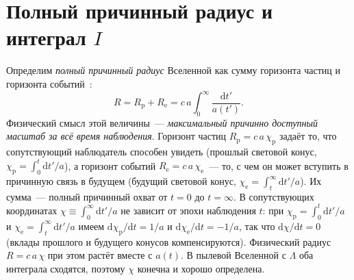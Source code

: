 \documentclass[12pt,a4paper]{article}
\begin{document}
\section{Полный причинный радиус и интеграл \texorpdfstring{$I$}{I}}

Определим \emph{полный причинный радиус} Вселенной как сумму горизонта частиц и горизонта событий~\cite{Davis2004}:
\begin{equation}
R = R_{\mathrm{p}} + R_{\mathrm{e}} = c\,a\int_0^{\infty}\frac{\mathrm{d}t'}{a(t')}.
\end{equation}
Физический смысл этой величины~--- \emph{максимальный причинно доступный масштаб за всё время наблюдения}. Горизонт частиц $R_{\mathrm{p}}=c\,a\,\chi_{\mathrm{p}}$ задаёт то, что сопутствующий наблюдатель способен увидеть (прошлый световой конус, $\chi_{\mathrm{p}}=\int_0^{t}\mathrm{d}t'/a$), а горизонт событий $R_{\mathrm{e}}=c\,a\,\chi_{\mathrm{e}}$~--- то, с чем он может вступить в причинную связь в будущем (будущий световой конус, $\chi_{\mathrm{e}}=\int_t^{\infty}\mathrm{d}t'/a$). Их сумма~--- полный причинный охват от $t=0$ до $t=\infty$. В сопутствующих координатах $\chi\equiv\int_0^{\infty}\mathrm{d}t'/a$ не зависит от эпохи наблюдения $t$: при $\chi_{\mathrm{p}}=\int_0^{t}\mathrm{d}t'/a$ и $\chi_{\mathrm{e}}=\int_t^{\infty}\mathrm{d}t'/a$ имеем $\mathrm{d}\chi_{\mathrm{p}}/\mathrm{d}t=1/a$ и $\mathrm{d}\chi_{\mathrm{e}}/\mathrm{d}t=-1/a$, так что $\mathrm{d}\chi/\mathrm{d}t=0$ (вклады прошлого и будущего конусов компенсируются). Физический радиус $R=c\,a\,\chi$ при этом растёт вместе с $a(t)$. В пылевой Вселенной с $\Lambda$ оба интеграла сходятся, поэтому $\chi$ конечна и хорошо определена.
\end{document}
